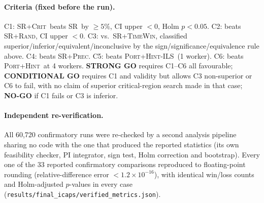 \documentclass[letterpaper]{article} %
\newcommand{\base}{\textsc{SR}}
\newcommand{\crit}{\textsc{SR+Crit}}
\newcommand{\rnd}{\textsc{SR+Rand}}
\newcommand{\tw}{\textsc{SR+TimeWin}}
\newcommand{\precn}{\textsc{SR+Prec}}
\newcommand{\ph}{\textsc{Port+Hint}}
\newcommand{\native}{\textsc{Port+Hint-ILS}}
\begin{document}
\paragraph{Criteria (fixed before the run).} C1: \crit\ beats \base\ by $\ge5\%$, CI upper $<0$, Holm $p<0.05$. C2: beats \rnd, CI upper $<0$. C3: vs.\ \tw, classified superior/inferior/equivalent/inconclusive by the sign/significance/equivalence rule above. C4: beats \precn. C5: beats \native\ (1 worker). C6: beats \ph\ at 4 workers. \textbf{STRONG GO} requires C1--C6 all favourable; \textbf{CONDITIONAL GO} requires C1 and validity but allows C3 non-superior or C6 to fail, with no claim of superior critical-region search made in that case; \textbf{NO-GO} if C1 fails or C3 is inferior.

\paragraph{Independent re-verification.} All 60{,}720 confirmatory runs were re-checked by a second analysis pipeline sharing no code with the one that produced the reported statistics (its own feasibility checker, PI integrator, sign test, Holm correction and bootstrap). Every one of the 33 reported confirmatory comparisons reproduced to floating-point rounding (relative-difference error $<1.2\times10^{-16}$), with identical win/loss counts and Holm-adjusted $p$-values in every case (\texttt{re\-sults/\-fi\-nal\_i\-caps/\-ver\-i\-fied\_met\-rics.json}).
\end{document}
